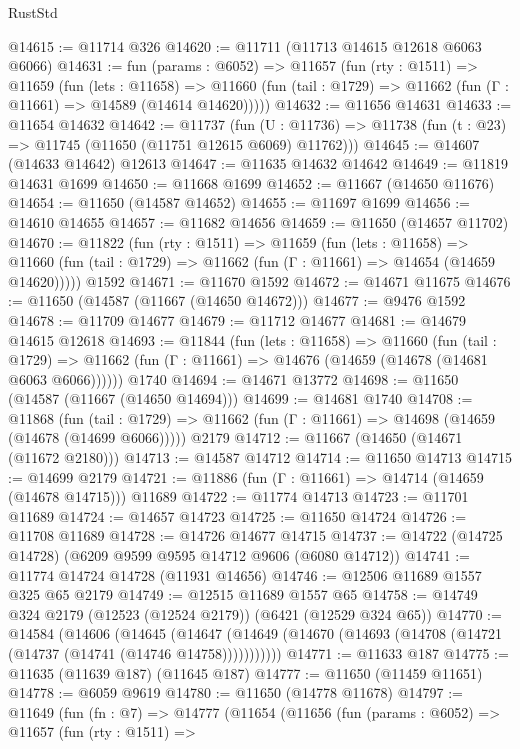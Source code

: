\begin{lexlean}{RustStd}
\begin{coremodule}
@14615 := @11714 @326
@14620 := @11711 (@11713 @14615 @12618 @6063 @6066)
@14631 := fun (params : @6052) =>
  @11657
    (fun (rty : @1511) =>
    @11659
      (fun (lets : @11658) =>
      @11660 (fun (tail : @1729) => @11662 (fun (Γ : @11661) => @14589 (@14614 @14620)))))
@14632 := @11656 @14631
@14633 := @11654 @14632
@14642 := @11737
    (fun (U : @11736) => @11738 (fun (t : @23) => @11745 (@11650 (@11751 @12615 @6069) @11762)))
@14645 := @14607 (@14633 @14642) @12613
@14647 := @11635 @14632 @14642
@14649 := @11819 @14631 @1699
@14650 := @11668 @1699
@14652 := @11667 (@14650 @11676)
@14654 := @11650 (@14587 @14652)
@14655 := @11697 @1699
@14656 := @14610 @14655
@14657 := @11682 @14656
@14659 := @11650 (@14657 @11702)
@14670 := @11822
    (fun (rty : @1511) =>
    @11659
      (fun (lets : @11658) =>
      @11660 (fun (tail : @1729) => @11662 (fun (Γ : @11661) => @14654 (@14659 @14620)))))
    @1592
@14671 := @11670 @1592
@14672 := @14671 @11675
@14676 := @11650 (@14587 (@11667 (@14650 @14672)))
@14677 := @9476 @1592
@14678 := @11709 @14677
@14679 := @11712 @14677
@14681 := @14679 @14615 @12618
@14693 := @11844
    (fun (lets : @11658) =>
    @11660
      (fun (tail : @1729) =>
      @11662 (fun (Γ : @11661) => @14676 (@14659 (@14678 (@14681 @6063 @6066))))))
    @1740
@14694 := @14671 @13772
@14698 := @11650 (@14587 (@11667 (@14650 @14694)))
@14699 := @14681 @1740
@14708 := @11868
    (fun (tail : @1729) => @11662 (fun (Γ : @11661) => @14698 (@14659 (@14678 (@14699 @6066)))))
    @2179
@14712 := @11667 (@14650 (@14671 (@11672 @2180)))
@14713 := @14587 @14712
@14714 := @11650 @14713
@14715 := @14699 @2179
@14721 := @11886 (fun (Γ : @11661) => @14714 (@14659 (@14678 @14715))) @11689
@14722 := @11774 @14713
@14723 := @11701 @11689
@14724 := @14657 @14723
@14725 := @11650 @14724
@14726 := @11708 @11689
@14728 := @14726 @14677 @14715
@14737 := @14722 (@14725 @14728) (@6209 @9599 @9595 @14712 @9606 (@6080 @14712))
@14741 := @11774 @14724 @14728 (@11931 @14656)
@14746 := @12506 @11689 @1557 @325 @65 @2179
@14749 := @12515 @11689 @1557 @65
@14758 := @14749 @324 @2179 (@12523 (@12524 @2179)) (@6421 (@12529 @324 @65))
@14770 := @14584
    (@14606
      (@14645
        (@14647 (@14649 (@14670 (@14693 (@14708 (@14721 (@14737 (@14741 (@14746 @14758)))))))))))
@14771 := @11633 @187
@14775 := @11635 (@11639 @187) (@11645 @187)
@14777 := @11650 (@11459 @11651)
@14778 := @6059 @9619
@14780 := @11650 (@14778 @11678)
@14797 := @11649
    (fun (fn : @7) =>
    @14777
      (@11654
        (@11656
          (fun (params : @6052) =>
          @11657
            (fun (rty : @1511) =>

\end{coremodule}
\end{lexlean}
